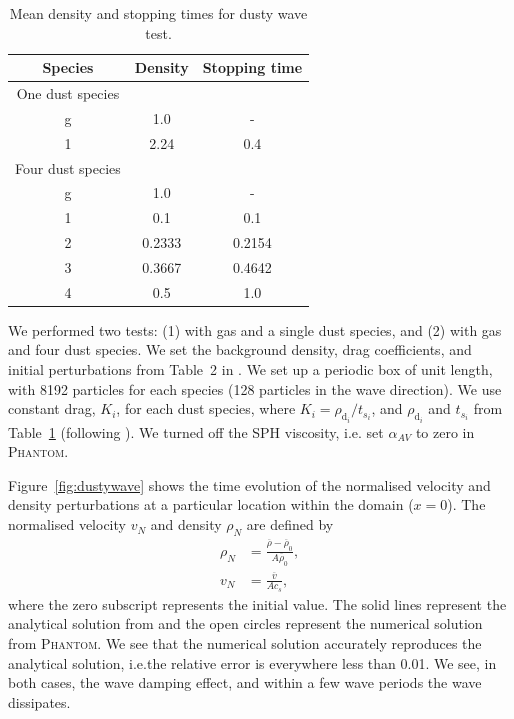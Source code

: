 \documentclass[fleqn,usenatbib]{mnras}
\newcommand{\dd}{\mathrm{d}}
\begin{document}
\begin{table}
   \centering
   \begin{tabular}{ccc}
      \hline
      \hline
      Species & Density & Stopping time \\
      \hline
      \hline
      One dust species \\
      g & 1.0 & - \\
      1 & 2.24 & 0.4 \\
      \hline
      Four dust species \\
      g & 1.0 & - \\
      1 & 0.1 & 0.1 \\
      2 & 0.2333 & 0.2154 \\
      3 & 0.3667 & 0.4642 \\
      4 & 0.5 & 1.0 \\
      \hline
      \hline
   \end{tabular}
   \caption{Mean density and stopping times for dusty wave test.}%
   \label{tab:wave}
\end{table}

We performed two tests: (1) with gas and a single dust species, and (2) with gas
and four dust species. We set the background density, drag coefficients, and
initial perturbations from Table~2 in
\citet{Benitez-Llambay2019ApJS..241...25B}. We set up a periodic box of unit
length, with 8192 particles for each species (128 particles in the wave
direction). We use constant drag, \(K_i\), for each dust species, where \(K_i =
\rho_{\dd_i} / t_{s_i}\), and \(\rho_{\dd_i}\) and \(t_{s_i}\) from
Table~\ref{tab:wave} (following \citealt{Benitez-Llambay2019ApJS..241...25B}).
We turned off the SPH viscosity, i.e. set \(\alpha_{AV}\) to zero in
\textsc{Phantom}.

Figure~\ref{fig:dustywave} shows the time evolution of the normalised velocity
and density perturbations at a particular location within the domain (\(x=0\)).
The normalised velocity \( v_N \) and density \( \rho_N \) are defined by
%
\begin{align}
   \rho_N &= \frac{\overline{\rho} - \overline{\rho}_0}{A \overline{\rho}_0}, \\
   v_N &= \frac{\overline{v}}{A c_s},
\end{align}
%
where the zero subscript represents the initial value. The solid lines represent
the analytical solution from \citet{Benitez-Llambay2019ApJS..241...25B} and the
open circles represent the numerical solution from \textsc{Phantom}. We see that
the numerical solution accurately reproduces the analytical solution, i.e.\@ the
relative error is everywhere less than 0.01. We see, in both cases, the wave
damping effect, and within a few wave periods the wave dissipates.
\end{document}
